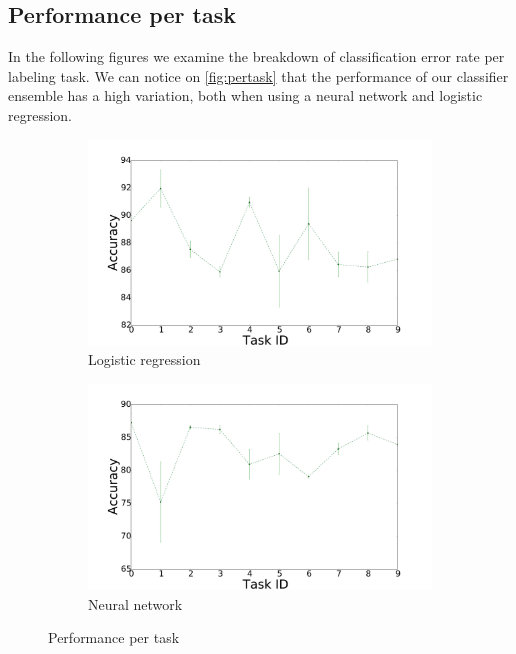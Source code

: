 \documentclass{llncs}
\begin{document}
\subsection{Performance per task}

In the following figures we examine the breakdown of classification error rate per labeling task. We can notice on \autoref{fig:pertask} that the performance of our classifier ensemble has a high variation, both when using a neural network and logistic regression.

\begin{figure}[!htb]

    \centering
    \begin{subfigure}[b]{0.45\textwidth}
        \includegraphics[width=\textwidth]{figures/task_logreg}
        \caption{Logistic regression}
    \end{subfigure}
    \begin{subfigure}[b]{0.45\textwidth}
        \includegraphics[width=\textwidth]{figures/task_mlp}
        \caption{Neural network}
    \end{subfigure}
    \caption{Performance per task}
    \label{fig:pertask}
    
\end{figure}
\end{document}

